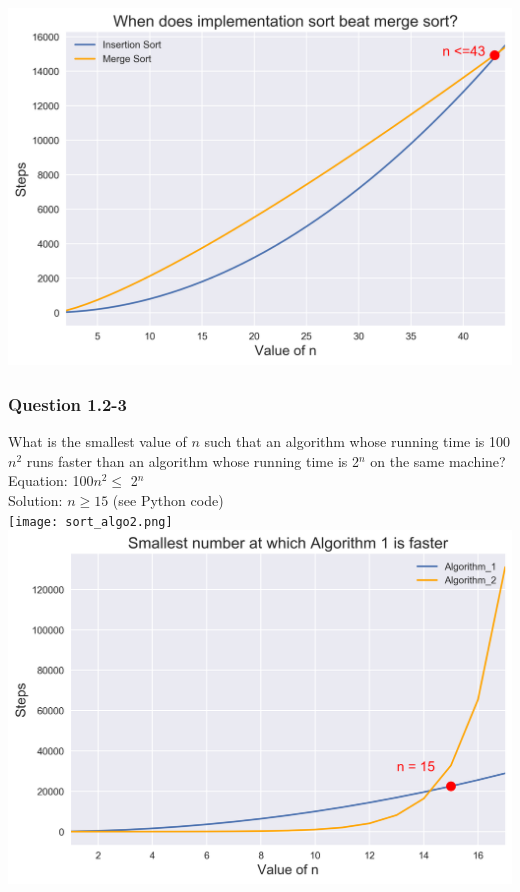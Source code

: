 \documentclass[10pt]{article}
\begin{document}
\includegraphics[scale=.65]{ques1.2-2.png}\\
\clearpage

\subsubsection*{Question 1.2-3}
What is the smallest value of $n$ such that an algorithm whose running time is 100$n^2$ runs faster than an algorithm whose running time is 2$^n$ on the same machine?\\

Equation: 100$n^2 \leq$ 2$^n$\\
\indent Solution: $n\geq15$ (see Python code)\\

\texttt{[image: sort\_algo2.png]}\\

\includegraphics[scale=.65]{ques1.2-3.png}\\
\end{document}
